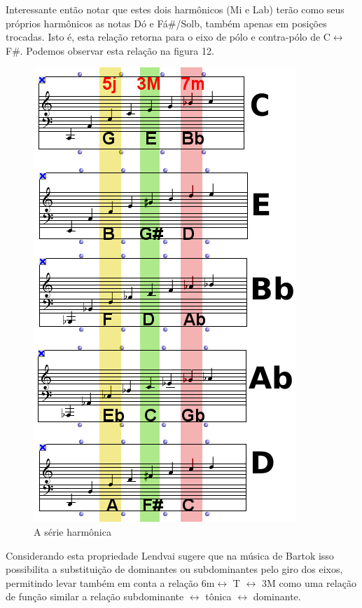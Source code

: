 \documentclass[
	12pt,				%
	openright,			%
	twoside,			%
	a4paper,			%
	english,			%
	french,				%
	spanish,			%
	brazil				%
	]{abntex2}
\begin{document}
Interessante então notar que estes dois harmônicos (Mi e Lab) terão como seus próprios harmônicos as notas Dó e Fá\#/Solb, também apenas em posições trocadas. Isto é, esta relação retorna para o eixo de pólo e contra-pólo de C$\leftrightarrow$F\#. Podemos observar esta relação na figura 12.
 

\begin{figure}[!h]
	\caption{\label{fig_grafico}A série harmônica }
	\begin{center}
	    \includegraphics[scale=0.65]{axis/eixo_acustico.png}
	\end{center}
\end{figure}

Considerando esta propriedade Lendvai sugere que na música de Bartok isso possibilita a substituição de dominantes ou subdominantes pelo giro dos eixos, permitindo levar também em conta a relação 6m$\leftrightarrow$ T $\leftrightarrow$ 3M como uma relação de função similar a relação subdominante $\leftrightarrow$ tônica $\leftrightarrow$ dominante. 
\end{document}
